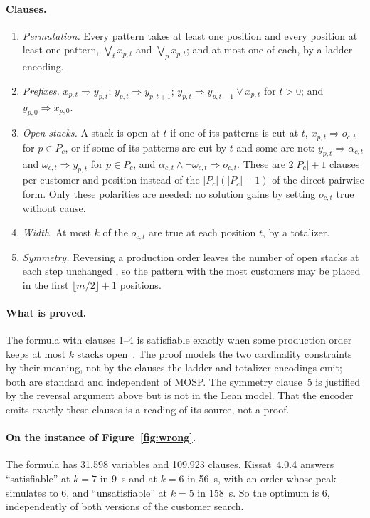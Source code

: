 \paragraph{Clauses.}
\begin{enumerate}
\item \emph{Permutation.} Every pattern takes at least one position and every
  position at least one pattern, $\bigvee_t x_{p,t}$ and $\bigvee_p x_{p,t}$;
  and at most one of each, by a ladder encoding.
\item \emph{Prefixes.} $x_{p,t}\Rightarrow y_{p,t}$;
  $y_{p,t}\Rightarrow y_{p,t+1}$; $y_{p,t}\Rightarrow y_{p,t-1}\vee x_{p,t}$
  for $t>0$; and $y_{p,0}\Rightarrow x_{p,0}$.
\item \emph{Open stacks.} A stack is open at $t$ if one of its patterns is cut
  at $t$, $x_{p,t}\Rightarrow o_{c,t}$ for $p\in P_c$, or if some of its
  patterns are cut by $t$ and some are not:
  $y_{p,t}\Rightarrow\alpha_{c,t}$ and $\omega_{c,t}\Rightarrow y_{p,t}$ for
  $p\in P_c$, and $\alpha_{c,t}\wedge\neg\omega_{c,t}\Rightarrow o_{c,t}$.
  These are $2|P_c|+1$ clauses per customer and position instead of the
  $|P_c|(|P_c|-1)$ of the direct pairwise form. Only these polarities are
  needed: no solution gains by setting $o_{c,t}$ true without cause.
\item \emph{Width.} At most $k$ of the $o_{c,t}$ are true at each position $t$,
  by a totalizer.
\item \emph{Symmetry.} Reversing a production order leaves the number of open
  stacks at each step unchanged \citep[Proposition~1]{Yanasse1997a}, so the
  pattern with the most customers may be placed in the first
  $\lfloor m/2\rfloor+1$ positions.
\end{enumerate}

\paragraph{What is proved.} The formula with clauses 1--4 is satisfiable exactly
when some production order keeps at most $k$ stacks open~. The proof models the two cardinality constraints by
their meaning, not by the clauses the ladder and totalizer encodings emit; both
are standard and independent of MOSP. The symmetry clause~5 is justified by the
reversal argument above but is not in the Lean model. That the encoder emits
exactly these clauses is a reading of its source, not a proof.

\paragraph{On the instance of Figure~\ref{fig:wrong}.} The formula has 31,598
variables and 109,923 clauses. Kissat~4.0.4 answers ``satisfiable'' at $k=7$
in 9~s and at $k=6$ in 56~s, with an order whose peak simulates to 6, and
``unsatisfiable'' at $k=5$ in 158~s. So the optimum is 6, independently of
both versions of the customer search.
